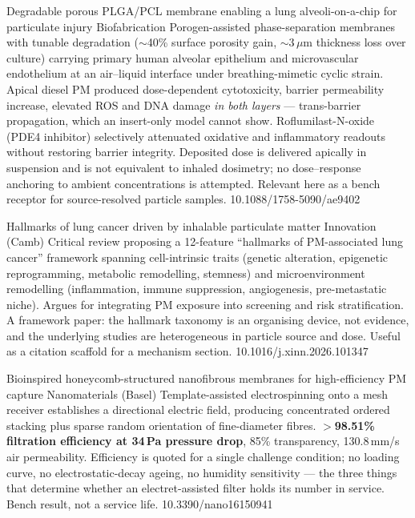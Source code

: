 \documentclass[10pt]{article}
\begin{document}

{Degradable porous PLGA/PCL membrane enabling a lung alveoli-on-a-chip for particulate injury}
{Biofabrication}
{Porogen-assisted phase-separation membranes with tunable degradation ($\sim$40\% surface
porosity gain, $\sim$3\,$\mu$m thickness loss over culture) carrying primary human
alveolar epithelium and microvascular endothelium at an air--liquid interface under
breathing-mimetic cyclic strain. Apical diesel PM produced dose-dependent cytotoxicity,
barrier permeability increase, elevated ROS and DNA damage \emph{in both layers} ---
trans-barrier propagation, which an insert-only model cannot show. Roflumilast-N-oxide
(PDE4 inhibitor) selectively attenuated oxidative and inflammatory readouts without
restoring barrier integrity. Deposited dose is delivered apically in suspension and is
not equivalent to inhaled dosimetry; no dose--response anchoring to ambient
concentrations is attempted. Relevant here as a bench receptor for source-resolved
particle samples.}
{10.1088/1758-5090/ae9402}

{Hallmarks of lung cancer driven by inhalable particulate matter}
{Innovation (Camb)}
{Critical review proposing a 12-feature ``hallmarks of PM-associated lung cancer''
framework spanning cell-intrinsic traits (genetic alteration, epigenetic reprogramming,
metabolic remodelling, stemness) and microenvironment remodelling (inflammation, immune
suppression, angiogenesis, pre-metastatic niche). Argues for integrating PM exposure into
screening and risk stratification. A framework paper: the hallmark taxonomy is an
organising device, not evidence, and the underlying studies are heterogeneous in particle
source and dose. Useful as a citation scaffold for a mechanism section.}
{10.1016/j.xinn.2026.101347}


{Bioinspired honeycomb-structured nanofibrous membranes for high-efficiency PM capture}
{Nanomaterials (Basel)}
{Template-assisted electrospinning onto a mesh receiver establishes a directional
electric field, producing concentrated ordered stacking plus sparse random orientation of
fine-diameter fibres. \textbf{$>$98.51\% filtration efficiency at 34\,Pa pressure drop},
85\% transparency, 130.8\,mm/s air permeability. Efficiency is quoted for a single
challenge condition; no loading curve, no electrostatic-decay ageing, no humidity
sensitivity --- the three things that determine whether an electret-assisted filter holds
its number in service. Bench result, not a service life.}
{10.3390/nano16150941}
\end{document}

